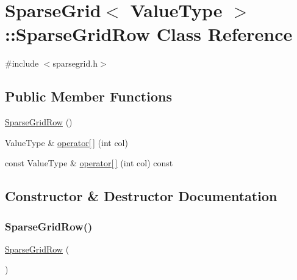 \hypertarget{classSparseGrid_1_1SparseGridRow}{}\section{Sparse\+Grid$<$ Value\+Type $>$\+:\+:Sparse\+Grid\+Row Class Reference}
\label{classSparseGrid_1_1SparseGridRow}


{\ttfamily \#include $<$sparsegrid.\+h$>$}

\subsection*{Public Member Functions}
\begin{DoxyCompactItemize}
\item 
\mbox{\hyperlink{classSparseGrid_1_1SparseGridRow_aa5d4f6adba083df13f540e21a0c3d8e7}{Sparse\+Grid\+Row}} ()
\item 
Value\+Type \& \mbox{\hyperlink{classSparseGrid_1_1SparseGridRow_a8bb588385a542bce972f4d3ce343744c}{operator\mbox{[}$\,$\mbox{]}}} (int col)
\item 
const Value\+Type \& \mbox{\hyperlink{classSparseGrid_1_1SparseGridRow_a03dfd191e6703aee65e6170436ccd18d}{operator\mbox{[}$\,$\mbox{]}}} (int col) const
\end{DoxyCompactItemize}


\subsection{Constructor \& Destructor Documentation}
\mbox{\label{classSparseGrid_1_1SparseGridRow_aa5d4f6adba083df13f540e21a0c3d8e7}} 
\subsubsection{\texorpdfstring{Sparse\+Grid\+Row()}{SparseGridRow()}}
{\footnotesize\ttfamily \mbox{\hyperlink{classSparseGrid_1_1SparseGridRow}{Sparse\+Grid\+Row}} (\begin{DoxyParamCaption}{ }\end{DoxyParamCaption})\hspace{0.3cm}{\ttfamily [inline]}}



